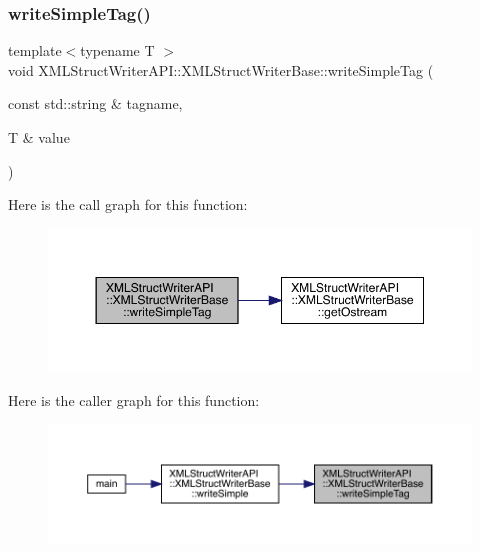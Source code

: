 \subsubsection{\texorpdfstring{writeSimpleTag()}{writeSimpleTag()}\hspace{0.1cm}{\footnotesize\ttfamily [2/3]}}
{\footnotesize\ttfamily template$<$typename T $>$ \\
void X\+M\+L\+Struct\+Writer\+A\+P\+I\+::\+X\+M\+L\+Struct\+Writer\+Base\+::write\+Simple\+Tag (\begin{DoxyParamCaption}\item[{const std\+::string \&}]{tagname,  }\item[{T \&}]{value }\end{DoxyParamCaption})\hspace{0.3cm}{\ttfamily [inline]}}

Here is the call graph for this function\+:
\nopagebreak
\begin{figure}[H]
\begin{center}
\leavevmode
\includegraphics[width=350pt]{db/d4f/classXMLStructWriterAPI_1_1XMLStructWriterBase_a049c80e79c8f64d2b6b0221c01392d37_cgraph}
\end{center}
\end{figure}
Here is the caller graph for this function\+:
\nopagebreak
\begin{figure}[H]
\begin{center}
\leavevmode
\includegraphics[width=350pt]{db/d4f/classXMLStructWriterAPI_1_1XMLStructWriterBase_a049c80e79c8f64d2b6b0221c01392d37_icgraph}
\end{center}
\end{figure}
\mbox{\label{classXMLStructWriterAPI_1_1XMLStructWriterBase_a049c80e79c8f64d2b6b0221c01392d37}} 
